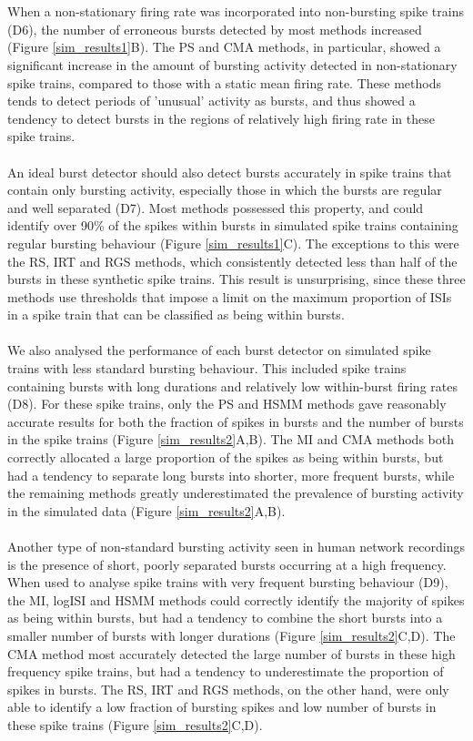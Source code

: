 \documentclass[12pt, titlepage]{article}
\begin{document}
	\\ \\ When a non-stationary firing rate was incorporated into non-bursting spike trains (D6), the number of erroneous bursts detected by most methods increased (Figure \ref{sim_results1}B). The PS and CMA methods, in particular, showed a significant increase in the amount of bursting activity detected in non-stationary spike trains, compared to those with a static mean firing rate. These methods tends to detect periods of 'unusual' activity as bursts, and thus showed a tendency to detect bursts in the regions of relatively high firing rate in these spike trains. 
	\\ \\ An ideal burst detector should also detect bursts accurately in spike trains that contain only bursting activity, especially those in which the bursts are regular and well separated (D7). Most methods possessed this property, and could identify over 90\% of the spikes within bursts in simulated spike trains containing regular bursting behaviour (Figure \ref{sim_results1}C). The exceptions to this were the RS, IRT and RGS methods, which consistently detected less than half of the bursts in these synthetic spike trains. This result is unsurprising, since these three methods use thresholds that impose a limit on the maximum proportion of ISIs in a spike train that can be classified as being within bursts.
	\\ \\ We also analysed the performance of each burst detector on simulated spike trains with less standard bursting behaviour. This included  spike trains containing bursts with long durations and relatively low within-burst firing rates (D8). For these spike trains, only the PS and HSMM methods gave reasonably accurate results for both the fraction of spikes in bursts and the number of bursts in the spike trains (Figure \ref{sim_results2}A,B). The MI and CMA methods both correctly allocated a large proportion of the spikes as being within bursts, but had a tendency to separate long bursts into shorter, more frequent bursts, while the remaining methods greatly underestimated the prevalence of bursting activity in the simulated data (Figure \ref{sim_results2}A,B).
	\\ \\ Another type of non-standard bursting activity seen in human network recordings is the presence of short, poorly separated bursts occurring at a high frequency. When used to analyse spike trains with very frequent bursting behaviour (D9), the MI, logISI and HSMM methods could correctly identify the majority of spikes as being within bursts, but had a tendency to combine the short bursts into a smaller number of bursts with longer durations (Figure \ref{sim_results2}C,D). The CMA method most accurately detected the large number of bursts in these high frequency spike trains, but had a tendency to underestimate the proportion of spikes in bursts. The RS, IRT and RGS methods, on the other hand, were only able to identify a low fraction of bursting spikes and low number of bursts in these spike trains (Figure \ref{sim_results2}C,D).
\end{document}
